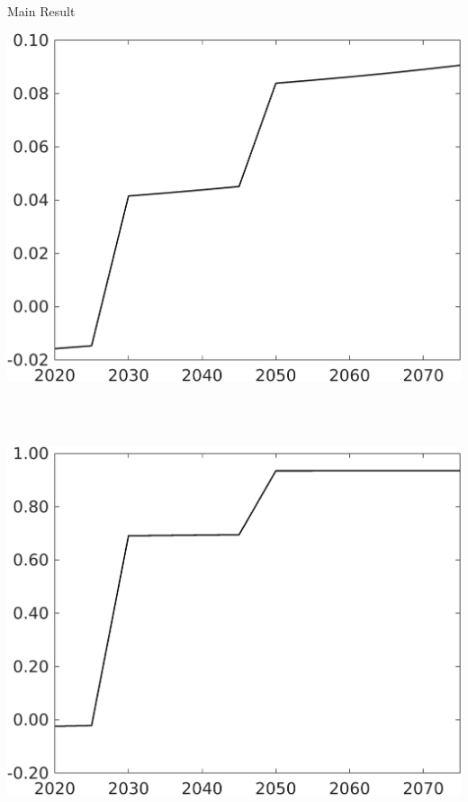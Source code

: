 \documentclass[11pt,aspectratio=169]{beamer}
\begin{document}
\begin{frame}{Main Result}
	\vspace{4mm}
			\centering
\begin{minipage}[]{0.32\textwidth}
	\includegraphics[width=1\textwidth]{../codding_model/own_basedOnFried/optimalPol_elastS_DisuSci/figures/all_1705/Single_OPT_T_NoTaus_taul_spillover0_sep1_BN0_ineq0_red0_etaa0.79.png}
\end{minipage}
\begin{minipage}[]{0.05\textwidth}
	\ \ \\ 
	\ \ 
\end{minipage}
	\begin{minipage}[]{0.32\textwidth}
	\includegraphics[width=1\textwidth]{../codding_model/own_basedOnFried/optimalPol_elastS_DisuSci/figures/all_1705/Single_OPT_T_NoTaus_tauf_spillover0_sep1_BN0_ineq0_red0_etaa0.79.png}

\end{minipage}
\end{frame}
\end{document}
